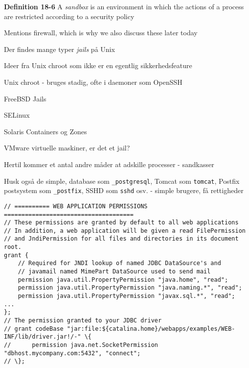 \documentclass[Screen16to9,17pt]{foils}
\begin{document}

\begin{list1}
\item {\bf Definition 18-6} A \emph{sandbox} is an environment in which the actions of a process are restricted according to a security policy
\item Mentions firewall, which is why we also discuss these later today
\end{list1}




\begin{list1}
\item Der findes mange typer \emph{jails} på Unix
\item Ideer fra Unix chroot som ikke er en egentlig sikkerhedsfeature
\begin{list2}
\item Unix chroot - bruges stadig, ofte i daemoner som OpenSSH
\item FreeBSD Jails
\item SELinux
\item Solaris Containers og Zones
\item VMware virtuelle maskiner, er det et jail?
\end{list2}
\item Hertil kommer et antal andre måder at adskille processer - sandkasser
\item Husk også de simple, database som \verb+_postgresql+, Tomcat som \verb+tomcat+, Postfix postsystem som \verb+_postfix+, SSHD som \verb+sshd+ osv. - simple brugere, få rettigheder
\end{list1}


\begin{verbatim}
// ========== WEB APPLICATION PERMISSIONS =====================================
// These permissions are granted by default to all web applications
// In addition, a web application will be given a read FilePermission
// and JndiPermission for all files and directories in its document root.
grant {
    // Required for JNDI lookup of named JDBC DataSource's and
    // javamail named MimePart DataSource used to send mail
    permission java.util.PropertyPermission "java.home", "read";
    permission java.util.PropertyPermission "java.naming.*", "read";
    permission java.util.PropertyPermission "javax.sql.*", "read";
...
};
// The permission granted to your JDBC driver
// grant codeBase "jar:file:${catalina.home}/webapps/examples/WEB-INF/lib/driver.jar!/-" \{
//      permission java.net.SocketPermission "dbhost.mycompany.com:5432", "connect";
// \};
\end{verbatim}
\end{document}
